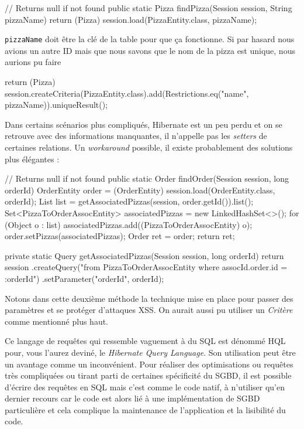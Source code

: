 \begin{javacode}
// Returns null if not found
public static Pizza findPizza(Session session, String pizzaName) {
    return (Pizza) session.load(PizzaEntity.class, pizzaName);
}
\end{javacode}

\verb|pizzaName| doit être la clé de la table pour que ça fonctionne.
Si par hasard nous avions un autre ID mais que nous savons que le nom de la pizza est unique, nous
aurions pu faire

\begin{javacode}
return (Pizza) session.createCriteria(PizzaEntity.class).add(Restrictions.eq("name", pizzaName)).uniqueResult();
\end{javacode}

Dans certains scénarios plus compliqués, Hibernate est un peu perdu et on se retrouve avec des informations manquantes,
il n'appelle pas les \emph{setters} de certaines relations. Un \emph{workaround} possible, il existe probablement
des solutions plus élégantes :

\begin{javacode}
// Returns null if not found
public static Order findOrder(Session session, long orderId) {
    OrderEntity order = (OrderEntity) session.load(OrderEntity.class, orderId);
    List list = getAssociatedPizzas(session, order.getId()).list();
    Set<PizzaToOrderAssocEntity> associatedPizzas = new LinkedHashSet<>();
    for (Object o : list) {
        associatedPizzas.add((PizzaToOrderAssocEntity) o);
    }
    order.setPizzas(associatedPizzas);
    Order ret = order;
    return ret;
}

private static Query getAssociatedPizzas(Session session, long orderId) {
    return session
            .createQuery("from PizzaToOrderAssocEntity where assocId.order.id = :orderId")
            .setParameter("orderId", orderId);
}
\end{javacode}

Notons dans cette deuxième méthode la technique mise en place pour passer des paramètres et se protéger
d'attaques XSS. On aurait aussi pu utiliser un \emph{Critère} comme mentionné plus haut.

Ce langage de requêtes qui ressemble vaguement à du SQL est dénommé HQL pour, vous l'aurez deviné,
le \emph{Hibernate Query Language}. Son utilisation peut être un avantage comme un inconvénient.
Pour réaliser des optimisations ou requêtes très compliquées ou tirant parti de certaines spécificité
du SGBD, il est possible d'écrire des requêtes en SQL mais c'est comme le code natif, à n'utiliser qu'en 
dernier recours car le code est alors lié à une implémentation de SGBD particulière et cela complique
la maintenance de l'application et la lisibilité du code.

